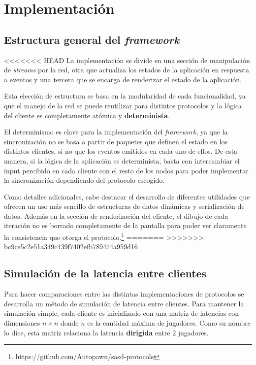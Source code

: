 \section{Implementación}


\subsection{Estructura general del \emph{framework}}

<<<<<<< HEAD
La implementación se divide en una sección de manipulación de \emph{streams} por la red, otra que actualiza los estados de la aplicación en respuesta a eventos y una tercera que se encarga de renderizar el estado de la aplicación.

Esta elección de estructura se basa en la modularidad de cada funcionalidad, ya que el manejo de la red se puede reutilizar para distintos protocolos y la lógica del cliente es completamente atómica y \textbf{determinista}.

El determinismo es clave para la implementación del \emph{framework}, ya que la sincronización no se basa a partir de paquetes que definen el estado en los distintos clientes, si no que los eventos emitidos en cada uno de ellos. De esta manera, si la lógica de la aplicación es determinista, basta con intercambiar el input percibido en cada cliente con el resto de los nodos para poder implementar la sincronización dependiendo del protocolo escogido.

Como detalles adicionales, cabe destacar el desarrollo de diferentes utilidades que ofrecen un uso más sencillo de estructuras de datos dinámicas y serialización de datos. Además en la sección de renderización del cliente, el dibujo de cada iteración no es borrado completamente de la pantalla para poder ver claramente la consistencia que otorga el protocolo.\footnote{https://github.com/Autopawn/sasd-protocols}
=======
%
>>>>>>> bc9ce5c2e51a349c439f7402efb789474a959d16

\subsection{Simulación de la latencia entre clientes}

Para hacer comparaciones entre las distintas implementaciones de protocolos se desarrolla un método de simulación de latencia entre clientes. Para mantener la simulación simple, cada cliente es inicializado con una matriz de latencias con dimensiones $n\times n$ donde $n$ es la cantidad máxima de jugadores. Como su nombre lo dice, esta matriz relaciona la latencia \textbf{dirigida} entre 2 jugadores.

